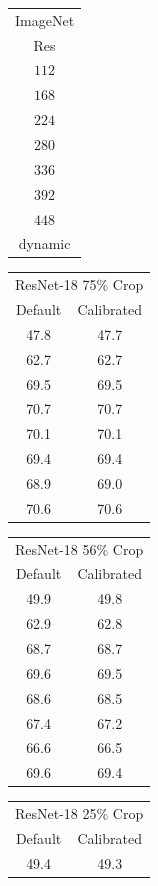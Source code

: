 \begin{table}
    \centering
    \begin{tabular}{c|}
    ImageNet\\
    Res \\
    \hline
    $112$ \\ 
    $168$ \\ 
    $224$ \\ 
    $280$ \\ 
    $336$ \\ 
    $392$ \\ 
    $448$ \\
    dynamic\\
    \end{tabular}
    \begin{tabular}{|c|c|}
    \multicolumn{2}{|c|}{ ResNet-18 75\% Crop}\\
    Default & Calibrated \\
    \hline
    47.8 & 47.7\\
    62.7 & 62.7\\ 
    69.5 & 69.5\\ 
    70.7 & 70.7\\ 
    70.1 & 70.1\\ 
    69.4 & 69.4\\ 
    68.9 & 69.0\\
    70.6 & 70.6\\ 
    \end{tabular}
    \begin{tabular}{|c|c|}
    \multicolumn{2}{|c|}{ ResNet-18 56\% Crop}\\
    Default & Calibrated  \\
    \hline
    49.9 & 49.8 \\ 
    62.9 & 62.8 \\ 
    68.7 & 68.7 \\ 
    69.6 & 69.5 \\ 
    68.6 & 68.5 \\ 
    67.4 & {\color{red}67.2} \\ 
    66.6 & 66.5 \\
    69.6 & {\color{red}69.4} \\ 
    \end{tabular}
    \begin{tabular}{|c|c|}
    \multicolumn{2}{|c|}{ ResNet-18 25\% Crop}\\
    Default & Calibrated  \\
    \hline
    49.4 & 49.3 \\ 

\end{tabular}
\end{table}
